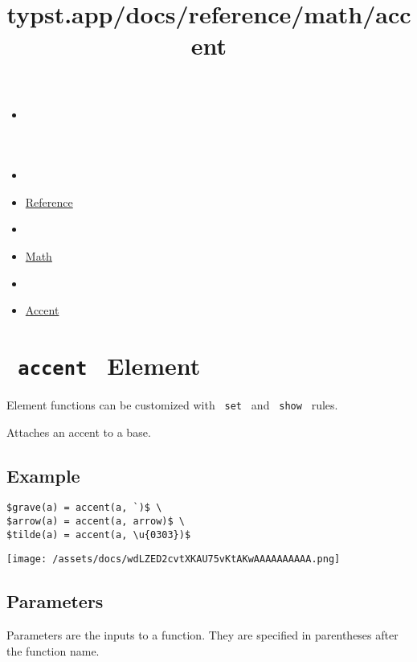 \title{typst.app/docs/reference/math/accent}

\begin{itemize}
\tightlist
\item
  \href{/docs}{}
\item
  
\item
  \href{/docs/reference/}{Reference}
\item
  
\item
  \href{/docs/reference/math/}{Math}
\item
  
\item
  \href{/docs/reference/math/accent/}{Accent}
\end{itemize}

\section{\texorpdfstring{\texttt{\ accent\ } {{ Element
}}}{ accent   Element }}\label{summary}

\label{element-tooltip}
Element functions can be customized with \texttt{\ set\ } and
\texttt{\ show\ } rules.

Attaches an accent to a base.

\subsection{Example}\label{example}

\begin{verbatim}
$grave(a) = accent(a, `)$ \
$arrow(a) = accent(a, arrow)$ \
$tilde(a) = accent(a, \u{0303})$
\end{verbatim}

\texttt{[image: /assets/docs/wdLZED2cvtXKAU75vKtAKwAAAAAAAAAA.png]}

\subsection{\texorpdfstring{{ Parameters
}}{ Parameters }}\label{parameters}

\label{parameters-tooltip}
Parameters are the inputs to a function. They are specified in
parentheses after the function name.

